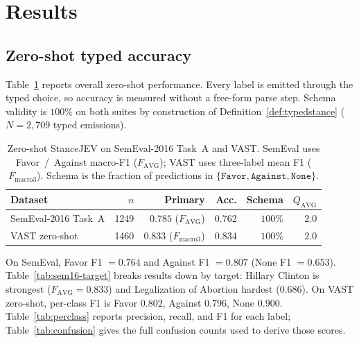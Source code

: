 \documentclass[10pt]{article}
\theoremstyle{definition}
\begin{document}
\section{Results}
\label{sec:results}

\subsection{Zero-shot typed accuracy}
Table~\ref{tab:overall} reports overall zero-shot performance.
Every label is emitted through the typed choice, so accuracy is measured without a free-form parse step.
Schema validity is $100\%$ on both suites by construction of Definition~\ref{def:typedstance}
($N{=}2{,}709$ typed emissions).

\begin{table}[H]
\centering
\small
\begin{tabular}{lrrrrr}
\toprule
Dataset & $n$ & Primary & Acc. & Schema & $Q_{\mathrm{AVG}}$ \\
\midrule
SemEval-2016 Task~A & 1249 & $0.785$ ($F_{\mathrm{AVG}}$) & $0.762$ & $100\%$ & $2.0$ \\
VAST zero-shot & 1460 & $0.833$ ($F_{\mathrm{macro3}}$) & $0.834$ & $100\%$ & $2.0$ \\
\bottomrule
\end{tabular}
\caption{Zero-shot StanceJEV on SemEval-2016 Task~A and VAST.
SemEval uses Favor~/~Against macro-F1 ($F_{\mathrm{AVG}}$); VAST uses three-label mean F1 ($F_{\mathrm{macro3}}$).
Schema is the fraction of predictions in $\{\texttt{Favor},\texttt{Against},\texttt{None}\}$.}
\label{tab:overall}
\end{table}

On SemEval, Favor F1 ${=}0.764$ and Against F1 ${=}0.807$ (None F1 ${=}0.653$).
Table~\ref{tab:sem16-target} breaks results down by target: Hillary Clinton is strongest
($F_{\mathrm{AVG}}{=}0.833$) and Legalization of Abortion hardest ($0.686$).
On VAST zero-shot, per-class F1 is Favor ${0.802}$, Against ${0.796}$, None ${0.900}$.
Table~\ref{tab:perclass} reports precision, recall, and F1 for each label; Table~\ref{tab:confusion}
gives the full confusion counts used to derive those scores.
\end{document}
